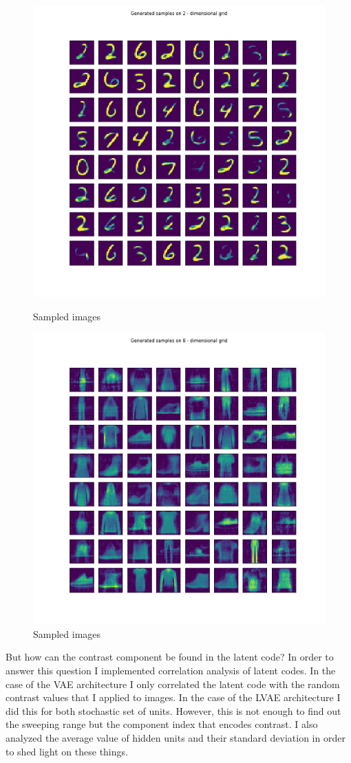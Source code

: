 \documentclass[12pt, english]{article}
\begin{document}
\vspace{4mm}

\begin{figure}[ht] 
  \begin{minipage}[b]{0.5\linewidth}
    \centering
    \includegraphics[width=.65\linewidth]{gen/generated_samples_mnist_dense_vae.png}
    \caption{Sampled images} 
  \end{minipage}%
  \begin{minipage}[b]{0.5\linewidth}
    \centering
    \includegraphics[width=.65\linewidth]{gen/generated_samples_fashion_mnist_dense_vae.png} 
    \caption{Sampled images} 
  \end{minipage} 
\end{figure}

\vspace{4mm}

\par But how can the contrast component be found in the latent code? In order to answer this question I implemented correlation analysis of latent codes. In the case of the VAE architecture I only correlated the latent code with the random contrast values that I applied to images. In the case of the LVAE architecture I did this for both stochastic set of units. However, this is not enough to find out the sweeping range but the component index that encodes contrast. I also analyzed the average value of hidden units and their standard deviation in order to shed light on these things.
\end{document}
